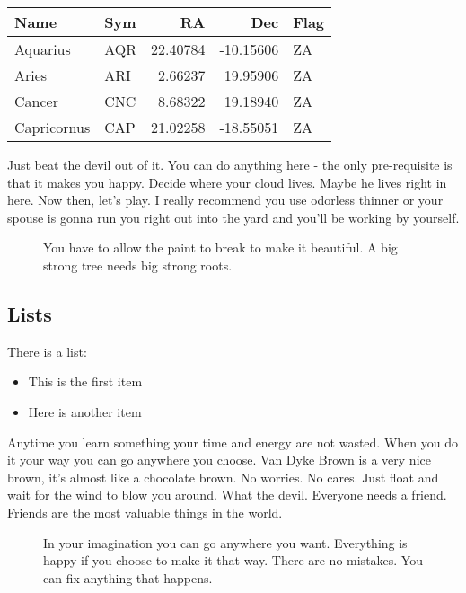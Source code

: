 \documentclass[twocolumn]{aastex63}
\begin{document}
\begin{table}
\begin{tabular}{llrrl}
\toprule
        Name &  Sym &        RA &       Dec & Flag \\
\midrule
    Aquarius &  AQR &  22.40784 & -10.15606 &   ZA \\
       Aries &  ARI &   2.66237 &  19.95906 &   ZA \\
      Cancer &  CNC &   8.68322 &  19.18940 &   ZA \\
 Capricornus &  CAP &  21.02258 & -18.55051 &   ZA \\
\bottomrule
\end{tabular}
\end{table}

Just beat the devil out of it. You can do anything here - the only
pre-requisite is that it makes you happy. Decide where your cloud lives.
Maybe he lives right in here. Now then, let's play. I really recommend
you use odorless thinner or your spouse is gonna run you right out into
the yard and you'll be working by yourself.

\begin{figure}[ht!]
\caption{You have to allow the paint to break to make it beautiful. A big strong tree needs big strong roots.
\label{fig:general}}
\end{figure}


\subsection{Lists}

There is a list:

\begin{itemize}
    \item This is the first item
    \item Here is another item
\end{itemize}

Anytime you learn something your time and energy are not wasted. When
you do it your way you can go anywhere you choose. Van Dyke Brown is a
very nice brown, it's almost like a chocolate brown. No worries. No
cares. Just float and wait for the wind to blow you around. What the
devil. Everyone needs a friend. Friends are the most valuable things in
the world.

\begin{figure}
\caption{In your imagination you can go anywhere you want. Everything is happy if you choose to make it that way. There are no mistakes. You can fix anything that happens.\label{fig:f2}}
\end{figure}
\end{document}
